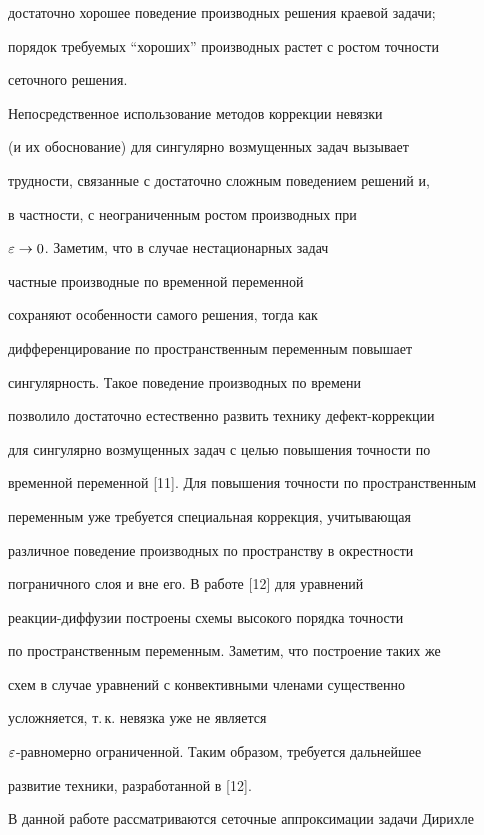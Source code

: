 достаточно хорошее поведение производных решения краевой задачи;


порядок требуемых ``хороших'' производных растет с ростом точности


сеточного решения.





Непосредственное использование методов коррекции невязки


(и их обоснование) для сингулярно возмущенных задач вызывает


трудности, связанные с достаточно сложным поведением решений и,


в частности, с неограниченным ростом производных при


$\varepsilon\to 0$. Заметим, что в случае нестационарных задач


частные производные по временной переменной


сохраняют особенности самого решения, тогда как


дифференцирование по пространственным переменным повышает


сингулярность. Такое поведение производных по времени


позволило достаточно естественно развить технику дефект-коррекции


для сингулярно возмущенных задач с целью повышения точности по


временной переменной [11]. Для повышения точности по пространственным


переменным уже требуется специальная коррекция, учитывающая


различное поведение производных по пространству в окрестности


пограничного слоя и вне его. В работе [12] для уравнений


реакции-диффузии построены схемы высокого порядка точности


по пространственным переменным. Заметим, что построение таких же


схем в случае уравнений с конвективными членами существенно


усложняется, т.\,к. невязка уже не является


$\varepsilon$-равномерно ограниченной. Таким образом, требуется дальнейшее


развитие техники, разработанной в [12].





В данной работе рассматриваются сеточные аппроксимации задачи Дирихле



